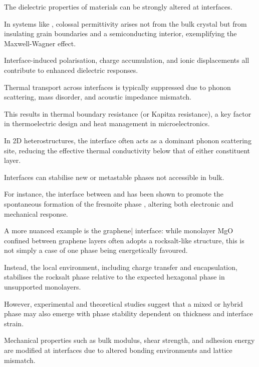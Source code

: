 \label{para:dielectric_interface_permittivity} %

The dielectric properties of materials can be strongly altered at interfaces.

In systems like , colossal permittivity arises not from the bulk crystal but from insulating grain
boundaries and a semiconducting interior, exemplifying the Maxwell-Wagner effect.

Interface-induced polarisation, charge accumulation, and ionic displacements all contribute to enhanced dielectric
responses.

\label{para:thermal_transport_interfaces} %

Thermal transport across interfaces is typically suppressed due to phonon scattering, mass disorder, and acoustic
impedance mismatch.

This results in thermal boundary resistance (or Kapitza resistance), a key factor in thermoelectric design and heat
management in microelectronics.

In 2D heterostructures, the interface often acts as a dominant phonon scattering site, reducing the effective thermal
conductivity below that of either constituent layer.

\label{para:interface_stabilise_metastable_phases} %

Interfaces can stabilise new or metastable phases not accessible in bulk.

For instance, the interface between  and  has been shown to promote the spontaneous formation of the
fresnoite phase , altering both electronic and mechanical response.

A more nuanced example is the graphene| interface: while monolayer MgO confined between graphene layers often
adopts a rocksalt-like structure, this is not simply a case of one phase being energetically favoured.

Instead, the local environment, including charge transfer and encapsulation, stabilises the rocksalt phase relative to
the expected hexagonal phase in unsupported monolayers.

However, experimental and theoretical studies suggest that a mixed or hybrid phase may also emerge with phase stability
dependent on thickness and interface strain.

\label{para:interface_mechanical_properties} %

Mechanical properties such as bulk modulus, shear strength, and adhesion energy are modified at interfaces due to
altered bonding environments and lattice mismatch.

